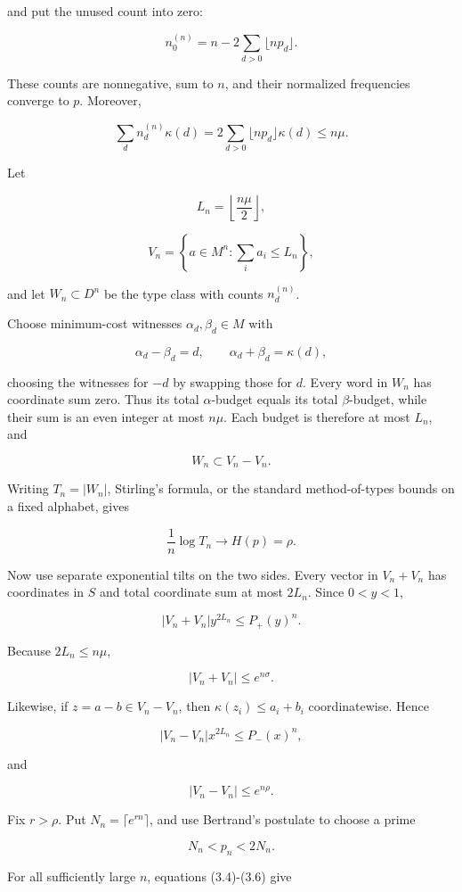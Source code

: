 \documentclass[
  10pt,
]{article}
\begin{document}
and put the unused count into zero:

\[
n_0^{(n)}=n-2\sum_{d>0}\lfloor np_d\rfloor.
\]

These counts are nonnegative, sum to \(n\), and their normalized
frequencies converge to \(p\). Moreover,

\[
\sum_d n_d^{(n)}\kappa(d)
=2\sum_{d>0}\lfloor np_d\rfloor\kappa(d)
\le n\mu.
\]

Let

\[
L_n=\left\lfloor\frac{n\mu}{2}\right\rfloor,
\]

\[
V_n=\left\{a\in M^n:\sum_i a_i\le L_n\right\},
\]

and let \(W_n\subset D^n\) be the type class with counts \(n_d^{(n)}\).

Choose minimum-cost witnesses \(\alpha_d,\beta_d\in M\) with

\[
\alpha_d-\beta_d=d,
\qquad
\alpha_d+\beta_d=\kappa(d),
\]

choosing the witnesses for \(-d\) by swapping those for \(d\). Every
word in \(W_n\) has coordinate sum zero. Thus its total
\(\alpha\)-budget equals its total \(\beta\)-budget, while their sum is
an even integer at most \(n\mu\). Each budget is therefore at most
\(L_n\), and

\[
W_n\subset V_n-V_n.
\]

Writing \(T_n=|W_n|\), Stirling's formula, or the standard
method-of-types bounds on a fixed alphabet, gives

\[
\frac1n\log T_n\longrightarrow H(p)=\rho.
\tag{3.4}
\]

Now use separate exponential tilts on the two sides. Every vector in
\(V_n+V_n\) has coordinates in \(S\) and total coordinate sum at most
\(2L_n\). Since \(0<y<1\),

\[
|V_n+V_n|y^{2L_n}\le P_+(y)^n.
\]

Because \(2L_n\le n\mu\),

\[
|V_n+V_n|\le e^{n\sigma}.
\tag{3.5}
\]

Likewise, if \(z=a-b\in V_n-V_n\), then \(\kappa(z_i)\le a_i+b_i\)
coordinatewise. Hence

\[
|V_n-V_n|x^{2L_n}\le P_-(x)^n,
\]

and

\[
|V_n-V_n|\le e^{n\rho}.
\tag{3.6}
\]

Fix \(r>\rho\). Put \(N_n=\lceil e^{rn}\rceil\), and use Bertrand's
postulate to choose a prime

\[
N_n<p_n<2N_n.
\]

For all sufficiently large \(n\), equations (3.4)-(3.6) give
\end{document}
